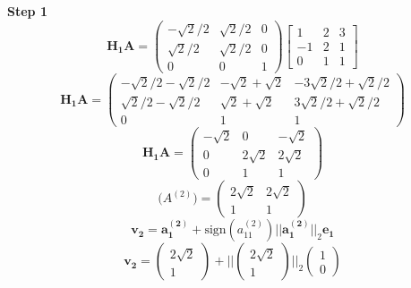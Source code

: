 \documentclass{article} %
\begin{document}
\textbf{Step 1} \\
\begin{equation}
\boldsymbol{H_1 A} = \begin{pmatrix} -\sqrt{2}/2 & \sqrt{2}/2 & 0 \\
 \sqrt{2}/2 & \sqrt{2}/2 & 0 \\
  0 & 0 & 1 \end{pmatrix}  \begin{bmatrix} 1 & 2 & 3 \\ -1 & 2 & 1 \\ 0 & 1 & 1 \end{bmatrix}
\end{equation}
\begin{equation}
\boldsymbol{H_1 A} = \begin{pmatrix} -\sqrt{2}/2-\sqrt{2}/2 & -\sqrt{2} + \sqrt{2} & -3\sqrt{2}/2+\sqrt{2}/2 \\
 \sqrt{2}/2-\sqrt{2}/2 & \sqrt{2} + \sqrt{2} & 3\sqrt{2}/2 + \sqrt{2}/2 \\
  0 & 1 & 1 \end{pmatrix}  
\end{equation}
\begin{equation}
\boldsymbol{H_1 A} = \begin{pmatrix} -\sqrt{2} & 0 & -\sqrt{2} \\
 0 & 2\sqrt{2} & 2\sqrt{2}  \\
  0 & 1 & 1 \end{pmatrix}  
\end{equation}
\begin{equation}
\boldsymbol(A^{(2)}) = \begin{pmatrix} 2\sqrt{2} & 2\sqrt{2} \\ 1 & 1 \end{pmatrix}
\end{equation}
\begin{equation}
\boldsymbol{v_2} = \boldsymbol{a_1^{(2)}} + \mbox{sign}(a_{11}^{(2)})||\boldsymbol{a_1^{(2)}}||_2 \boldsymbol{e_1}
\end{equation}
\begin{equation}
\boldsymbol{v_2} = \begin{pmatrix} 2\sqrt{2} \\ 1 \end{pmatrix} + ||\begin{pmatrix} 2\sqrt{2} \\ 1 \end{pmatrix}||_2 \begin{pmatrix} 1 \\ 0 \end{pmatrix}
\end{equation}
\end{document}
